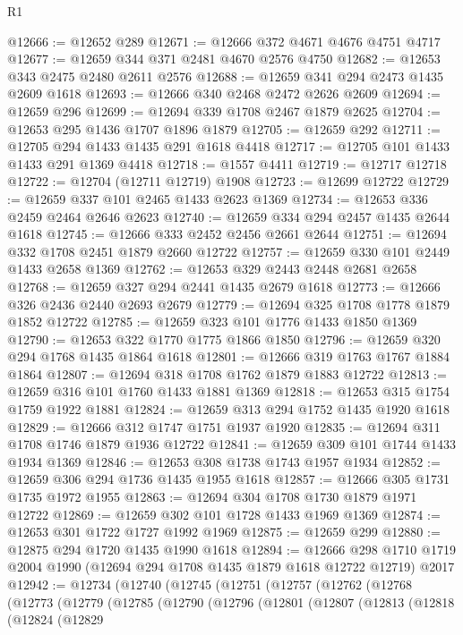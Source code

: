 \begin{lexlean}{R1}
\begin{coremodule}
@12666 := @12652 @289
@12671 := @12666 @372 @4671 @4676 @4751 @4717
@12677 := @12659 @344 @371 @2481 @4670 @2576 @4750
@12682 := @12653 @343 @2475 @2480 @2611 @2576
@12688 := @12659 @341 @294 @2473 @1435 @2609 @1618
@12693 := @12666 @340 @2468 @2472 @2626 @2609
@12694 := @12659 @296
@12699 := @12694 @339 @1708 @2467 @1879 @2625
@12704 := @12653 @295 @1436 @1707 @1896 @1879
@12705 := @12659 @292
@12711 := @12705 @294 @1433 @1435 @291 @1618 @4418
@12717 := @12705 @101 @1433 @1433 @291 @1369 @4418
@12718 := @1557 @4411
@12719 := @12717 @12718
@12722 := @12704 (@12711 @12719) @1908
@12723 := @12699 @12722
@12729 := @12659 @337 @101 @2465 @1433 @2623 @1369
@12734 := @12653 @336 @2459 @2464 @2646 @2623
@12740 := @12659 @334 @294 @2457 @1435 @2644 @1618
@12745 := @12666 @333 @2452 @2456 @2661 @2644
@12751 := @12694 @332 @1708 @2451 @1879 @2660 @12722
@12757 := @12659 @330 @101 @2449 @1433 @2658 @1369
@12762 := @12653 @329 @2443 @2448 @2681 @2658
@12768 := @12659 @327 @294 @2441 @1435 @2679 @1618
@12773 := @12666 @326 @2436 @2440 @2693 @2679
@12779 := @12694 @325 @1708 @1778 @1879 @1852 @12722
@12785 := @12659 @323 @101 @1776 @1433 @1850 @1369
@12790 := @12653 @322 @1770 @1775 @1866 @1850
@12796 := @12659 @320 @294 @1768 @1435 @1864 @1618
@12801 := @12666 @319 @1763 @1767 @1884 @1864
@12807 := @12694 @318 @1708 @1762 @1879 @1883 @12722
@12813 := @12659 @316 @101 @1760 @1433 @1881 @1369
@12818 := @12653 @315 @1754 @1759 @1922 @1881
@12824 := @12659 @313 @294 @1752 @1435 @1920 @1618
@12829 := @12666 @312 @1747 @1751 @1937 @1920
@12835 := @12694 @311 @1708 @1746 @1879 @1936 @12722
@12841 := @12659 @309 @101 @1744 @1433 @1934 @1369
@12846 := @12653 @308 @1738 @1743 @1957 @1934
@12852 := @12659 @306 @294 @1736 @1435 @1955 @1618
@12857 := @12666 @305 @1731 @1735 @1972 @1955
@12863 := @12694 @304 @1708 @1730 @1879 @1971 @12722
@12869 := @12659 @302 @101 @1728 @1433 @1969 @1369
@12874 := @12653 @301 @1722 @1727 @1992 @1969
@12875 := @12659 @299
@12880 := @12875 @294 @1720 @1435 @1990 @1618
@12894 := @12666
    @298
    @1710
    @1719
    @2004
    @1990
    (@12694 @294 @1708 @1435 @1879 @1618 @12722 @12719)
    @2017
@12942 := @12734
    (@12740
      (@12745
        (@12751
          (@12757
            (@12762
              (@12768
                (@12773
                  (@12779
                    (@12785
                      (@12790
                        (@12796
                          (@12801
                            (@12807
                              (@12813
                                (@12818
                                  (@12824
                                    (@12829

\end{coremodule}
\end{lexlean}

